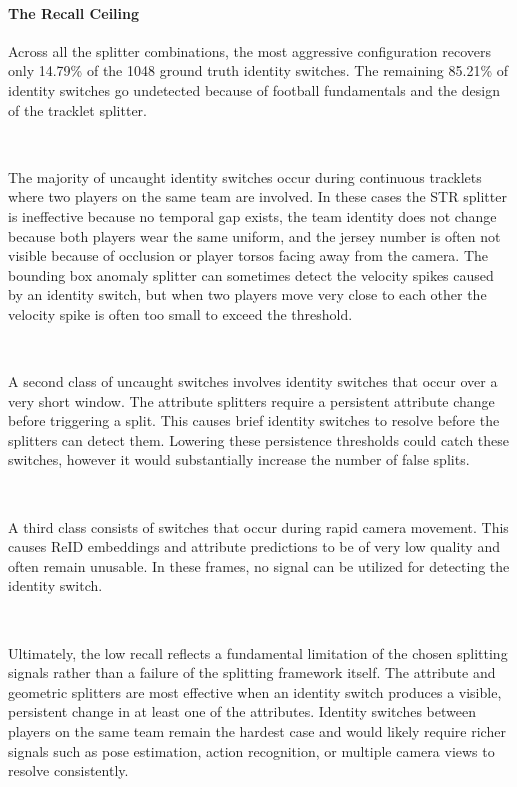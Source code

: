 \paragraph{The Recall Ceiling}
Across all the splitter combinations, the most aggressive configuration recovers only 14.79\% of the 1048 ground truth identity switches. The remaining 85.21\% of identity switches go undetected because of football fundamentals and the design of the tracklet splitter.

\

The majority of uncaught identity switches occur during continuous tracklets where two players on the same team are involved. In these cases the STR splitter is ineffective because no temporal gap exists, the team identity does not change because both players wear the same uniform, and the jersey number is often not visible because of occlusion or player torsos facing away from the camera. The bounding box anomaly splitter can sometimes detect the velocity spikes caused by an identity switch, but when two players move very close to each other the velocity spike is often too small to exceed the threshold.

\

A second class of uncaught switches involves identity switches that occur over a very short window. The attribute splitters require a persistent attribute change before triggering a split. This causes brief identity switches to resolve before the splitters can detect them. Lowering these persistence thresholds could catch these switches, however it would substantially increase the number of false splits.

\

A third class consists of switches that occur during rapid camera movement. This causes ReID embeddings and attribute predictions to be of very low quality and often remain unusable. In these frames, no signal can be utilized for detecting the identity switch.

\

Ultimately, the low recall reflects a fundamental limitation of the chosen splitting signals rather than a failure of the splitting framework itself. The attribute and geometric splitters are most effective when an identity switch produces a visible, persistent change in at least one of the attributes. Identity switches between players on the same team remain the hardest case and would likely require richer signals such as pose estimation, action recognition, or multiple camera views to resolve consistently.

